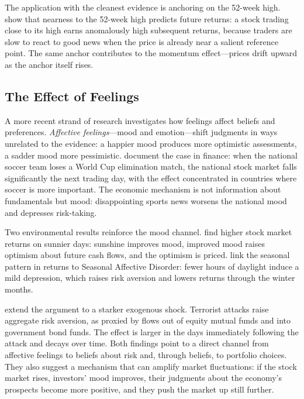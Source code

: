 The application with the cleanest evidence is anchoring on the 52-week high. \citet{george2004} show that nearness to the 52-week high predicts future returns: a stock trading close to its high earns anomalously high subsequent returns, because traders are slow to react to good news when the price is already near a salient reference point. The same anchor contributes to the momentum effect---prices drift upward as the anchor itself rises.

\subsection{The Effect of Feelings}

A more recent strand of research investigates how feelings affect beliefs and preferences. \emph{Affective feelings}---mood and emotion---shift judgments in ways unrelated to the evidence: a happier mood produces more optimistic assessments, a sadder mood more pessimistic. \citet{edmans2006} document the case in finance: when the national soccer team loses a World Cup elimination match, the national stock market falls significantly the next trading day, with the effect concentrated in countries where soccer is more important. The economic mechanism is not information about fundamentals but mood: disappointing sports news worsens the national mood and depresses risk-taking.

Two environmental results reinforce the mood channel. \citet{hirshleifer2003} find higher stock market returns on sunnier days: sunshine improves mood, improved mood raises optimism about future cash flows, and the optimism is priced. \citet{kamstra2003} link the seasonal pattern in returns to Seasonal Affective Disorder: fewer hours of daylight induce a mild depression, which raises risk aversion and lowers returns through the winter months.

\citet{wang2020} extend the argument to a starker exogenous shock. Terrorist attacks raise aggregate risk aversion, as proxied by flows out of equity mutual funds and into government bond funds. The effect is larger in the days immediately following the attack and decays over time. Both findings point to a direct channel from affective feelings to beliefs about risk and, through beliefs, to portfolio choices. They also suggest a mechanism that can amplify market fluctuations: if the stock market rises, investors' mood improves, their judgments about the economy's prospects become more positive, and they push the market up still further.

